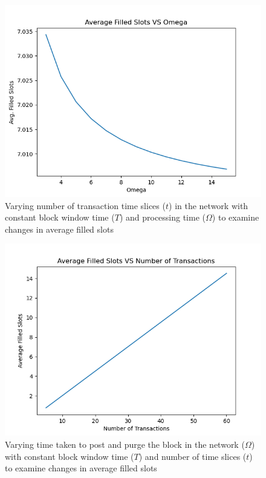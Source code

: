 \documentclass[conference]{IEEEtran}
\begin{document}
\begin{figure}[htbp]
    \centerline{\includegraphics[width=\linewidth]{Figures/AvgFilledSlotsVSOmegaConstTrnx.png}}
    \caption{Varying number of transaction time slices ($t$) in the network with constant block window time ($T$) and processing time ($\Omega$) to examine changes in average filled slots}
    \label{AFS_omega}
\end{figure}

\begin{figure}[htbp]
    \centerline{\includegraphics[width=\linewidth]{Figures/AvgFilledSlotsVSNoOfTrnxConstOmega.png}}
    \caption{Varying time taken to post and purge the block in the network ($\Omega$) with constant block window time ($T$) and number of time slices ($t$)  to examine changes in average filled slots}
    \label{AFS_trans}
\end{figure}
\end{document}
